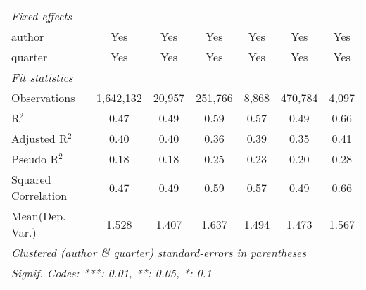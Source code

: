 \begin{tabular}{lcccccc}
   \midrule
   \emph{Fixed-effects}\\
   author                                                     & Yes            & Yes            & Yes           & Yes          & Yes            & Yes\\  
   quarter                                                    & Yes            & Yes            & Yes           & Yes          & Yes            & Yes\\  
   \midrule
   \emph{Fit statistics}\\
   Observations                                               & 1,642,132      & 20,957         & 251,766       & 8,868        & 470,784        & 4,097\\  
   R$^2$                                                      & 0.47           & 0.49           & 0.59          & 0.57         & 0.49           & 0.66\\  
   Adjusted R$^2$                                             & 0.40           & 0.40           & 0.36          & 0.39         & 0.35           & 0.41\\  
   Pseudo R$^2$                                               & 0.18           & 0.18           & 0.25          & 0.23         & 0.20           & 0.28\\  
   Squared Correlation                                        & 0.47           & 0.49           & 0.59          & 0.57         & 0.49           & 0.66\\  
Mean(Dep. Var.) & 1.528 & 1.407 & 1.637 & 1.494 & 1.473 & 1.567 \\
   \midrule \midrule
   \multicolumn{7}{l}{\emph{Clustered (author \& quarter) standard-errors in parentheses}}\\
   \multicolumn{7}{l}{\emph{Signif. Codes: ***: 0.01, **: 0.05, *: 0.1}}\\
\end{tabular}
\par\endgroup
